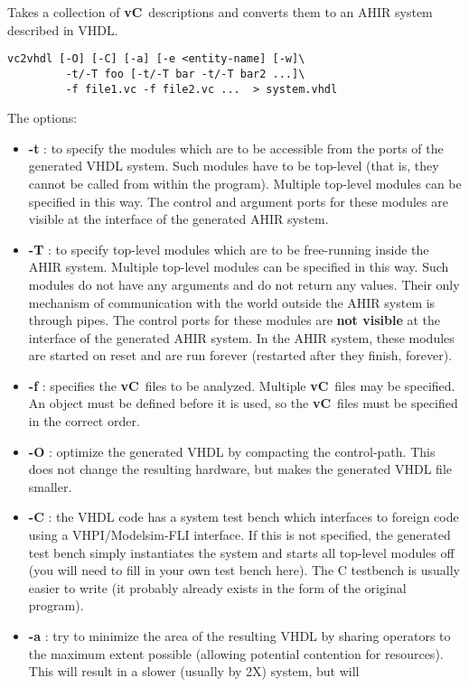 \documentclass{article}
\newcommand{\vC}{{\bf vC}~}
\begin{document}
Takes a collection of \vC descriptions and converts them to
an AHIR system described in VHDL.
\begin{verbatim}
vc2vhdl [-O] [-C] [-a] [-e <entity-name] [-w]\
         -t/-T foo [-t/-T bar -t/-T bar2 ...]\
         -f file1.vc -f file2.vc ...  > system.vhdl
\end{verbatim}

The options:
\begin{itemize}
\item {\bf -t} : to specify the modules which are to be 
accessible from the ports of the generated VHDL system.
Such modules have to be top-level (that is, they cannot
be called from within the program).
Multiple top-level modules can be specified in this way.
The control and argument ports for these modules are
visible at the interface of the generated AHIR system.
\item {\bf -T} : to specify top-level modules which are to be 
free-running inside the AHIR system.
Multiple top-level modules can be specified in this way.
Such modules do not have any arguments and do not return
any values.  Their only mechanism of communication with
the world outside the AHIR system is through pipes.
The control ports for these modules are
{\bf not visible} at the interface of the generated AHIR system.
In the AHIR system, these modules are started on reset
and are run forever (restarted after they finish, forever).
\item {\bf -f} : specifies the \vC files to be analyzed. 
Multiple \vC files may be specified.  An object must be
defined before it is used, so the \vC files must be 
specified in the correct order.
\item {\bf -O} : optimize the generated VHDL by compacting
the control-path.  This does not change the resulting
hardware, but makes the generated VHDL file smaller.
\item {\bf -C} : the VHDL code has a system test bench which
interfaces to foreign code using a VHPI/Modelsim-FLI interface.
If this is not specified, the  generated test bench simply
instantiates the system and starts all top-level modules
off (you will need to fill in your own test bench here).
The C testbench is usually easier to write (it probably
already exists in the form of the original program).
\item {\bf -a} : try to minimize the area of the resulting
VHDL by sharing operators to the maximum extent possible
(allowing potential contention for resources).  This will
result in a slower (usually by 2X) system, but will

\end{itemize}
\end{document}
